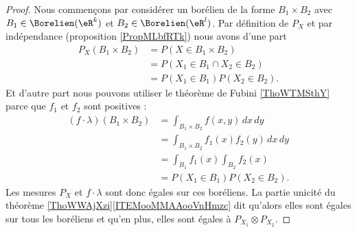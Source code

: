 \begin{proof}
	Nous commençons par considérer un borélien de la forme \( B_1\times B_2\) avec \( B_1\in\Borelien(\eR^k)\) et \( B_2\in\Borelien(\eR^l)\). Par définition de \( P_X\) et par indépendance (proposition \ref{PropMLbfRTk}) nous avons d'une part
	\begin{subequations}
		\begin{align}
			P_X(B_1\times B_2) & =P(X\in B_1\times B_2)        \\
			                   & =P(X_1\in B_1\cap X_2\in B_2) \\
			                   & =P(X_1\in B_1)P(X_2\in B_2).
		\end{align}
	\end{subequations}
	Et d'autre part nous pouvons utiliser le théorème de Fubini \ref{ThoWTMSthY} parce que \( f_1\) et \( f_2\) sont positives :
	\begin{subequations}
		\begin{align}
			(f\cdot \lambda)(B_1\times B_2) & =\int_{B_1\times B_2}f(x,y)\,dx\,dy       \\
			                                & =\int_{B_1\times B_2}f_1(x)f_2(y)\,dx\,dy \\
			                                & =\int_{B_1}f_1(x)\int_{B_2}f_2(x)         \\
			                                & =P(X_1\in B_1)P(X_2\in B_2).
		\end{align}
	\end{subequations}
	Les mesures \( P_X\) et \( f\cdot\lambda\) sont donc égales sur ces boréliens. La partie unicité du théorème \ref{ThoWWAjXzi}\ref{ITEMooMMAAooVnHmzc} dit qu'alors elles sont égales sur tous les boréliens et qu'en plus, elles sont égales à \( P_{X_1}\otimes P_{X_2}\).
\end{proof}

